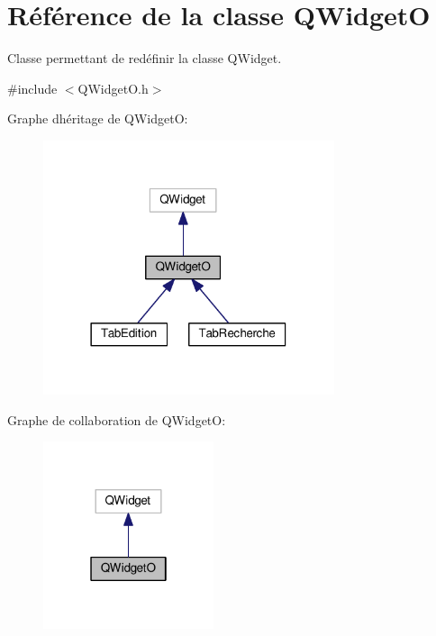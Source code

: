 \hypertarget{class_q_widget_o}{}\section{Référence de la classe Q\+WidgetO}
\label{class_q_widget_o}


Classe permettant de redéfinir la classe Q\+Widget.  




{\ttfamily \#include $<$Q\+Widget\+O.\+h$>$}



Graphe d\textquotesingle{}héritage de Q\+WidgetO\+:\nopagebreak
\begin{figure}[H]
\begin{center}
\leavevmode
\includegraphics[width=242pt]{class_q_widget_o__inherit__graph}
\end{center}
\end{figure}


Graphe de collaboration de Q\+WidgetO\+:\nopagebreak
\begin{figure}[H]
\begin{center}
\leavevmode
\includegraphics[width=142pt]{class_q_widget_o__coll__graph}
\end{center}
\end{figure}
